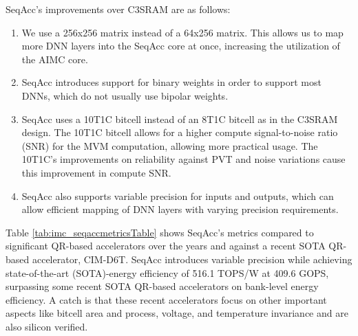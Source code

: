 SeqAcc's improvements over C3SRAM are as follows:
\begin{enumerate}
    \item We use a 256x256 matrix instead of a 64x256 matrix. This allows us to map more DNN layers into the SeqAcc core at once, increasing the utilization of the AIMC core.
    \item SeqAcc introduces support for binary weights in order to support most DNNs, which do not usually use bipolar weights.
    \item SeqAcc uses a 10T1C bitcell instead of an 8T1C bitcell as in the C3SRAM design. The 10T1C bitcell allows for a higher compute signal-to-noise ratio (SNR) for the MVM computation, allowing more practical usage. The 10T1C's improvements on reliability against PVT and noise variations cause this improvement in compute SNR.
    \item SeqAcc also supports variable precision for inputs and outputs, which can allow efficient mapping of DNN layers with varying precision requirements. 
\end{enumerate}

Table \ref{tab:imc_seqaccmetricsTable} shows SeqAcc's metrics compared to significant QR-based accelerators over the years and against a recent SOTA QR-based accelerator, CIM-D6T. SeqAcc introduces variable precision while achieving state-of-the-art (SOTA)-energy efficiency of 516.1 TOPS/W at 409.6 GOPS, surpassing some recent SOTA QR-based accelerators on bank-level energy efficiency. A catch is that these recent accelerators focus on other important aspects like bitcell area and process, voltage, and temperature invariance and are also silicon verified.

